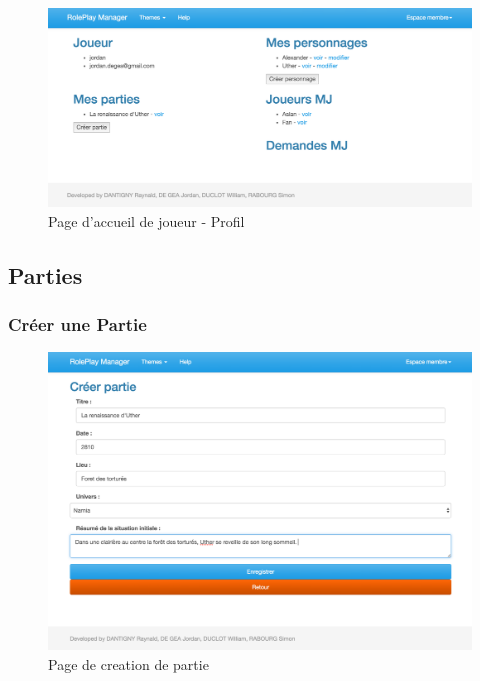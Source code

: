 \documentclass[a4paper,oneside,10pt]{article}
\begin{document}
\begin{figure}[H]
	\begin{center}
		\includegraphics[width=\textwidth]{images/manuel/profil.png}  
		\caption{Page d'accueil de joueur - Profil}
	\end{center}
\end{figure}


\subsection{Parties}

\subsubsection{Créer une Partie}
\label{MUCreerPartie}
\begin{figure}[H]
	\begin{center}
		\includegraphics[width=\textwidth]{images/manuel/creerpartie.png}  
		\caption{Page de creation de partie}
	\end{center}
\end{figure}
\end{document}

